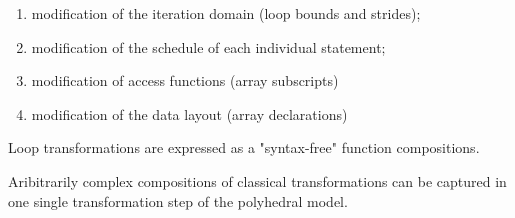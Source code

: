 \begin{enumerate}
  \item modification of the iteration domain (loop bounds and strides);
  \item modification of the schedule of each individual statement;
  \item modification of access functions (array subscripts)
  \item modification of the data layout (array declarations)
\end{enumerate}

Loop transformations are expressed as a "syntax-free" function compositions.

Aribitrarily complex compositions of classical transformations can be captured
in one single transformation step of the polyhedral model.
